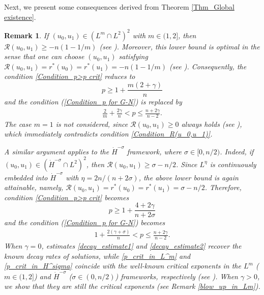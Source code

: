 \documentclass[11pt,reqno]{amsart}
\newtheorem{remark}{Remark}[section]
\begin{document}
Next, we present some consequences derived from Theorem \ref{Thm_Global existence}.

\begin{remark}\label{globalexistence_Lm}
\selectfont
If $(u_0,u_1)\in (L^m\cap L^2)^2$ with $m \in (1, 2]$, then $\mathcal{R}(u_0, u_1)\geq -n(1-1/m)$ (see \cite{ADL2024}). Moreover, this lower bound is optimal in the sense that one can choose $(u_0,u_1)$ satisfying $ \mathcal{R}(u_0, u_1) = r^*(u_0)=r^*(u_1)=-n\left(1-1/m\right)$ (see \cite{ADD2026}). Consequently, the condition \eqref{Condition_p>p crit} reduces to
\begin{equation}\label{p_crit_in_L^m}
p\ge 1+\frac{m(2+\gamma)}{n}
\end{equation}
and the condition (\ref{Condition_p for G-N}) is replaced by
\begin{align*}
    \frac{2}{m}+\frac{2\gamma}{n} < p \leq \frac{n+2\gamma}{n-2}. 
\end{align*}
The case $m=1$ is not considered, since $\mathcal{R}(u_0,u_1)\geq 0$ always holds (see \cite{ADL2024}), which immediately contradicts condition \eqref{Condition_R(u_0,u_1)}. 

A similar argument applies to the $\dot{H}^{-\sigma}$ framework, where $\sigma \in [0, n/2)$. Indeed, if $(u_0,u_1)\in (\dot{H}^{-\sigma}\cap L^2)^2$, then $\mathcal{R}(u_0, u_1) \geq \sigma-n/2$. Since $L^\eta$ is continuously embedded into $\dot{H}^{-\sigma}$ with $\eta=2n/(n+2\sigma)$, the above lower bound is again attainable, namely, $\mathcal{R}(u_0, u_1) = r^*(u_0)=r^*(u_1)=\sigma-n/2$. Therefore, condition \eqref{Condition_p>p crit} becomes
\begin{equation}\label{p_crit_in_H^sigma}
p\ge 1+\frac{4+2\gamma}{n+2\sigma}
\end{equation}
and the condition (\ref{Condition_p for G-N}) becomes
\begin{align*}
    1+\frac{2(\gamma+\sigma)}{n} < p \leq \frac{n+2\gamma}{n-2}. 
\end{align*}
When $\gamma=0$, estimates \eqref{decay_estimate1} and \eqref{decay_estimate2} recover the known decay rates of solutions, while \eqref{p_crit_in_L^m} and \eqref{p_crit_in_H^sigma} coincide with the well-known critical exponents in the $L^m$ ($m\in(1,2]$) and $\dot{H}^{-\sigma}$ ($\sigma\in(0,n/2)$) frameworks, respectively (see \cite{DAbbicco2017,Chen2023}). When $\gamma>0$, we show that they are still the critical exponents (see Remark \ref{blow_up_in_Lm}).
\end{remark}
\end{document}
